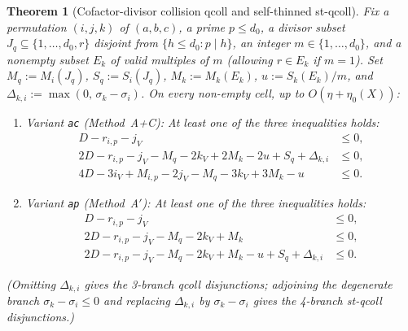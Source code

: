 \documentclass[11pt,a4paper]{amsart}
\theoremstyle{plain}
\newtheorem{theorem}{Theorem}[section]
\theoremstyle{definition}
\theoremstyle{remark}
\begin{document}
\begin{theorem}[Cofactor-divisor collision \textsf{qcoll} and self-thinned \textsf{st-qcoll}]\label{thm:qcoll}
Fix a permutation $(i,j,k)$ of $(a,b,c)$, a prime $p \le d_0$, a divisor subset $J_q \subseteq \{1,\dots,d_0,r\}$ disjoint from $\{h \le d_0 : p \mid h\}$, an integer $m \in \{1,\dots,d_0\}$, and a nonempty subset $E_k$ of valid multiples of $m$ (allowing $r \in E_k$ if $m=1$). Set $M_q := M_i(J_q)$, $S_q := S_i(J_q)$, $M_k := M_k(E_k)$, $u := S_k(E_k)/m$, and $\Delta_{k,i} := \max(0,\, \sigma_k - \sigma_i)$. On every non-empty cell, up to $O(\eta + \eta_0(X))$:
\begin{enumerate}[label=(\roman*)]
\item \emph{Variant \texttt{ac} (Method~A+C):} At least one of the three inequalities holds:
\begin{align*}
  D - r_{i,p} - j_V &\le 0, \\
  2 D - r_{i,p} - j_V - M_q - 2 k_V + 2 M_k - 2 u + S_q + \Delta_{k,i} &\le 0, \\
  4 D - 3 i_V + M_{i,p} - 2 j_V - M_q - 3 k_V + 3 M_k - u &\le 0.
\end{align*}
\item \emph{Variant \texttt{ap} (Method~A$'$):} At least one of the three inequalities holds:
\begin{align*}
  D - r_{i,p} - j_V &\le 0, \\
  2 D - r_{i,p} - j_V - M_q - 2 k_V + M_k &\le 0, \\
  2 D - r_{i,p} - j_V - M_q - 2 k_V + M_k - u + S_q + \Delta_{k,i} &\le 0.
\end{align*}
\end{enumerate}
(Omitting $\Delta_{k,i}$ gives the 3-branch \textsf{qcoll} disjunctions; adjoining the degenerate branch $\sigma_k - \sigma_i \le 0$ and replacing $\Delta_{k,i}$ by $\sigma_k - \sigma_i$ gives the 4-branch \textsf{st-qcoll} disjunctions.)
\end{theorem}
\end{document}

